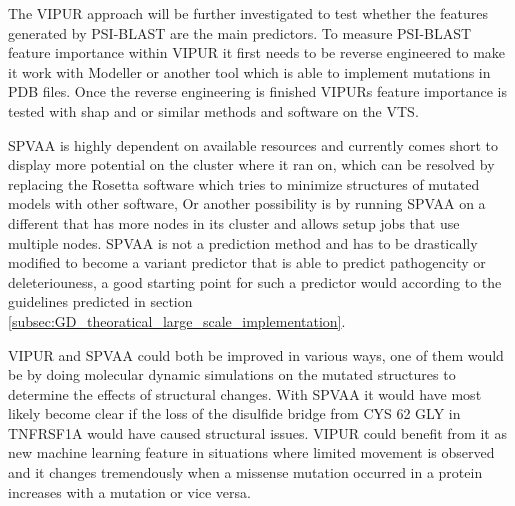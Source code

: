 The VIPUR approach will be further investigated to test whether the features generated by PSI-BLAST are the main predictors. To measure PSI-BLAST feature importance within VIPUR it first needs to be reverse engineered to make it work with Modeller or another tool which is able to implement mutations in PDB files. Once the reverse engineering is finished VIPURs feature importance is tested with shap\cite{} and or similar methods and software on the VTS.

SPVAA is highly dependent on available resources and currently comes short to display more potential on the cluster where it ran on, which can be resolved by replacing the Rosetta software which tries to minimize structures of mutated models with other software, Or another possibility is by running SPVAA on a different that has more nodes in its cluster and allows setup jobs that use multiple nodes. SPVAA is not a prediction method and has to be drastically modified to become a variant predictor that is able to predict pathogencity or deleteriouness, a good starting point for such a predictor would according to the guidelines predicted in section \ref{subsec:GD_theoratical_large_scale_implementation}.

VIPUR and SPVAA could both be improved in various ways, one of them would be by doing molecular dynamic simulations on the mutated structures to determine the effects of structural changes. With SPVAA it would have most likely become clear if the loss of the disulfide bridge from CYS 62 GLY  in TNFRSF1A would have caused structural issues. VIPUR could benefit from it as new machine learning feature in situations where limited movement is observed and it changes tremendously when a missense mutation occurred in a protein increases with a mutation or vice versa.



